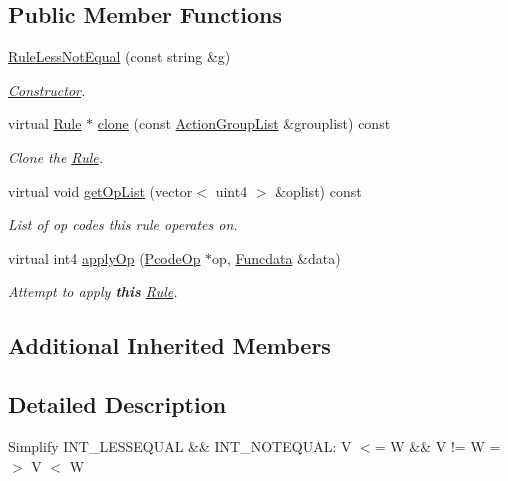 \subsection*{Public Member Functions}
\begin{DoxyCompactItemize}
\item 
\mbox{\hyperlink{class_rule_less_not_equal_a8e3e35af93a2ac716ea10aa2381ec8d6}{Rule\+Less\+Not\+Equal}} (const string \&g)
\begin{DoxyCompactList}\small\item\em \mbox{\hyperlink{class_constructor}{Constructor}}. \end{DoxyCompactList}\item 
virtual \mbox{\hyperlink{class_rule}{Rule}} $\ast$ \mbox{\hyperlink{class_rule_less_not_equal_a8e163306125fbd3f7c5f507ef84cc4d4}{clone}} (const \mbox{\hyperlink{class_action_group_list}{Action\+Group\+List}} \&grouplist) const
\begin{DoxyCompactList}\small\item\em Clone the \mbox{\hyperlink{class_rule}{Rule}}. \end{DoxyCompactList}\item 
virtual void \mbox{\hyperlink{class_rule_less_not_equal_aa260561402061a7c93f711be9ab7f284}{get\+Op\+List}} (vector$<$ uint4 $>$ \&oplist) const
\begin{DoxyCompactList}\small\item\em List of op codes this rule operates on. \end{DoxyCompactList}\item 
virtual int4 \mbox{\hyperlink{class_rule_less_not_equal_a08fa964bfe43c6783d801d5c33d46d7a}{apply\+Op}} (\mbox{\hyperlink{class_pcode_op}{Pcode\+Op}} $\ast$op, \mbox{\hyperlink{class_funcdata}{Funcdata}} \&data)
\begin{DoxyCompactList}\small\item\em Attempt to apply {\bfseries{this}} \mbox{\hyperlink{class_rule}{Rule}}. \end{DoxyCompactList}\end{DoxyCompactItemize}
\subsection*{Additional Inherited Members}


\subsection{Detailed Description}
Simplify I\+N\+T\+\_\+\+L\+E\+S\+S\+E\+Q\+U\+AL \&\& I\+N\+T\+\_\+\+N\+O\+T\+E\+Q\+U\+AL\+: {\ttfamily V $<$= W \&\& V != W =$>$ V $<$ W} 

